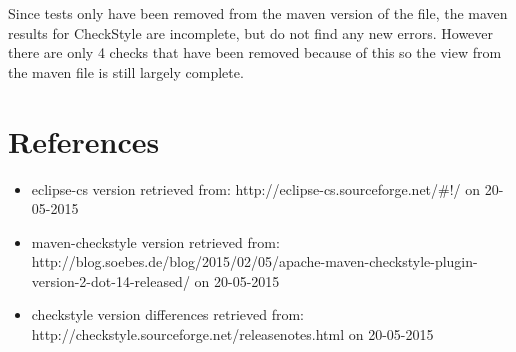 \documentclass[11pt,a4paper]{report}
\begin{document}
Since tests only have been removed from the maven version of the file, the maven results for CheckStyle are incomplete, but do not find any new errors. However there are only 4 checks that have been removed because of this so the view from the maven file is still largely complete.

\chapter{References}

\begin{itemize}

\item eclipse-cs version retrieved from: http://eclipse-cs.sourceforge.net/\#!/ on 20-05-2015

\item maven-checkstyle version retrieved from: http://blog.soebes.de/blog/2015/02/05/apache-maven-checkstyle-plugin-version-2-dot-14-released/ on 20-05-2015

\item checkstyle version differences retrieved from: http://checkstyle.sourceforge.net/releasenotes.html on 20-05-2015

\end{itemize}
\end{document}
